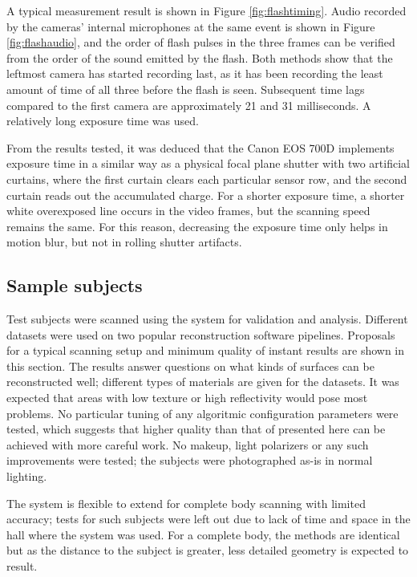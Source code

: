A typical measurement result is shown in Figure \ref{fig:flashtiming}.
Audio recorded by the cameras' internal microphones at the same event is shown in Figure \ref{fig:flashaudio}, and the order of flash pulses in the three frames can be verified from the order of the sound emitted by the flash.
Both methods show that the leftmost camera has started recording last, as it has been recording the least amount of time of all three before the flash is seen.
Subsequent time lags compared to the first camera are approximately 21 and 31 milliseconds.
A relatively long exposure time was used.

From the results tested, it was deduced that the Canon EOS 700D implements exposure time in a similar way as a physical focal plane shutter with two artificial curtains, where the first curtain clears each particular sensor row, and the second curtain reads out the accumulated charge.
For a shorter exposure time, a shorter white overexposed line occurs in the video frames, but the scanning speed remains the same.
For this reason, decreasing the exposure time only helps in motion blur, but not in rolling shutter artifacts.

\subsection{Sample subjects} \label{sec:samplesubjects}


Test subjects were scanned using the system for validation and analysis.
Different datasets were used on two popular reconstruction software pipelines.
Proposals for a typical scanning setup and minimum quality of instant results are shown in this section.
The results answer questions on what kinds of surfaces can be reconstructed well; different types of materials are given for the datasets.
It was expected that areas with low texture or high reflectivity would pose most problems.
No particular tuning of any algoritmic configuration parameters were tested, which suggests that higher quality than that of presented here can be achieved with more careful work.
No makeup, light polarizers or any such improvements were tested; the subjects were photographed as-is in normal lighting.

The system is flexible to extend for complete body scanning with limited accuracy; tests for such subjects were left out due to lack of time and space in the hall where the system was used.
For a complete body, the methods are identical but as the distance to the subject is greater, less detailed geometry is expected to result.

